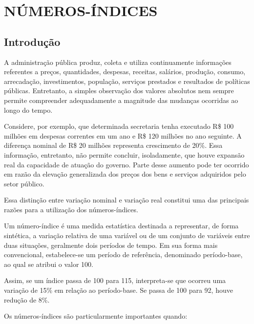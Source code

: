\chapter{NÚMEROS-ÍNDICES}
\section{Introdução}

A administração pública produz, coleta e utiliza continuamente informações referentes a preços, quantidades, despesas, receitas, salários, produção, consumo, arrecadação, investimentos, população, serviços prestados e resultados de políticas públicas. Entretanto, a simples observação dos valores absolutos nem sempre permite compreender adequadamente a magnitude das mudanças ocorridas ao longo do tempo. \vskip0.3cm

Considere, por exemplo, que determinada secretaria tenha executado R\$ 100 milhões em despesas correntes em um ano e R\$ 120 milhões no ano seguinte. A diferença nominal de R\$ 20 milhões representa crescimento de 20\%. Essa informação, entretanto, não permite concluir, isoladamente, que houve expansão real da capacidade de atuação do governo. Parte desse aumento pode ter ocorrido em razão da elevação generalizada dos preços dos bens e serviços adquiridos pelo setor público. \vskip0.3cm

Essa distinção entre variação nominal e variação real constitui uma das principais razões para a utilização dos números-índices. \vskip0.3cm

Um número-índice é uma medida estatística destinada a representar, de forma sintética, a variação relativa de uma variável ou de um conjunto de variáveis entre duas situações, geralmente dois períodos de tempo. Em sua forma mais convencional, estabelece-se um período de referência, denominado período-base, ao qual se atribui o valor 100. \vskip0.3cm

Assim, se um índice passa de 100 para 115, interpreta-se que ocorreu uma variação de 15\% em relação ao período-base. Se passa de 100 para 92, houve redução de 8\%. 

\newpage
Os números-índices são particularmente importantes quando:

